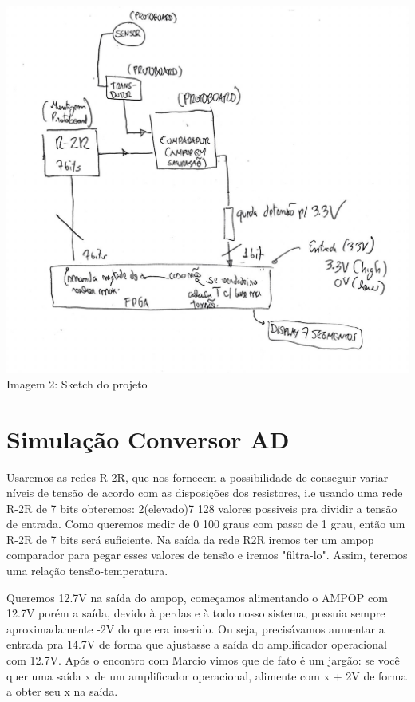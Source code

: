 \documentclass{article}
\begin{document}
\begin{center}
    \includegraphics[scale=0.3]{images/sketchprojeto.jpg}
    Imagem 2: Sketch do projeto
\end{center}

\section{Simulação Conversor AD}
Usaremos as redes R-2R, que nos fornecem a possibilidade de conseguir variar níveis de tensão de acordo com as disposições dos resistores, i.e usando uma rede R-2R de 7 bits obteremos: 2(elevado)7 128 valores possiveis pra dividir a tensão de entrada. Como queremos medir de 0 100 graus com passo de 1 grau, então um R-2R de 7 bits será suficiente. Na saída da rede R2R iremos ter um ampop comparador para pegar esses valores de tensão e iremos "filtra-lo". Assim, teremos uma relação tensão-temperatura.

Queremos 12.7V na saída do ampop, começamos alimentando o AMPOP com 12.7V porém a saída, devido à perdas e à todo nosso sistema, possuia sempre aproximadamente -2V do que era inserido. Ou seja, precisávamos aumentar a entrada pra 14.7V de forma que ajustasse a saída do amplificador operacional com 12.7V. Após o encontro com Marcio vimos que de fato é um jargão: se você quer uma saída x de um amplificador operacional, alimente com x + 2V de forma a obter seu x na saída.
\end{document}
